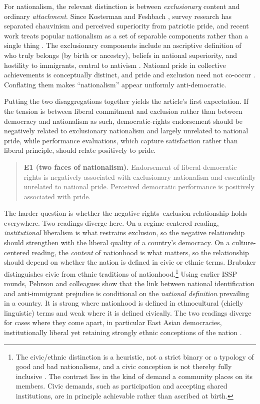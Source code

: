 For nationalism, the relevant distinction is between \emph{exclusionary} content and ordinary \emph{attachment}. Since Kosterman and Feshbach \citeyearpar{kosterman1989}, survey research has separated chauvinism and perceived superiority from patriotic pride, and recent work treats popular nationalism as a set of separable components rather than a single thing \citep{bonikowski2016asr, bonikowski2017}. The exclusionary components include an ascriptive definition of who truly belongs (by birth or ancestry), beliefs in national superiority, and hostility to immigrants, central to nativism \citep{mudde2007}. National pride in collective achievements is conceptually distinct, and pride and exclusion need not co-occur \citep{hjerm1998}. Conflating them makes ``nationalism'' appear uniformly anti-democratic.

Putting the two disaggregations together yields the article's first expectation. If the tension is between liberal commitment and exclusion rather than between democracy and nationalism as such, democratic-rights endorsement should be negatively related to exclusionary nationalism and largely unrelated to national pride, while performance evaluations, which capture satisfaction rather than liberal principle, should relate positively to pride.

\begin{quote}
\textbf{E1 (two faces of nationalism).} Endorsement of liberal-democratic rights is negatively associated with exclusionary nationalism and essentially unrelated to national pride. Perceived democratic performance is positively associated with pride.
\end{quote}

The harder question is whether the negative rights--exclusion relationship holds everywhere. Two readings diverge here. On a regime-centered reading, \emph{institutional} liberalism is what restrains exclusion, so the negative relationship should strengthen with the liberal quality of a country's democracy. On a culture-centered reading, the \emph{content} of nationhood is what matters, so the relationship should depend on whether the nation is defined in civic or ethnic terms. Brubaker \citeyearpar{brubaker1992} distinguishes civic from ethnic traditions of nationhood.\footnote{The civic/ethnic distinction is a heuristic, not a strict binary or a typology of good and bad nationalisms, and a civic conception is not thereby fully inclusive \citep{simonsen2020civic}. The contrast lies in the kind of demand a community places on its members. Civic demands, such as participation and accepting shared institutions, are in principle achievable rather than ascribed at birth.} Using earlier ISSP rounds, Pehrson and colleagues \citeyearpar{pehrson2009} show that the link between national identification and anti-immigrant prejudice is conditional on the \emph{national definition} prevailing in a country. It is strong where nationhood is defined in ethnocultural (chiefly linguistic) terms and weak where it is defined civically. The two readings diverge for cases where they come apart, in particular East Asian democracies, institutionally liberal yet retaining strongly ethnic conceptions of the nation \citep{shin2006}.

